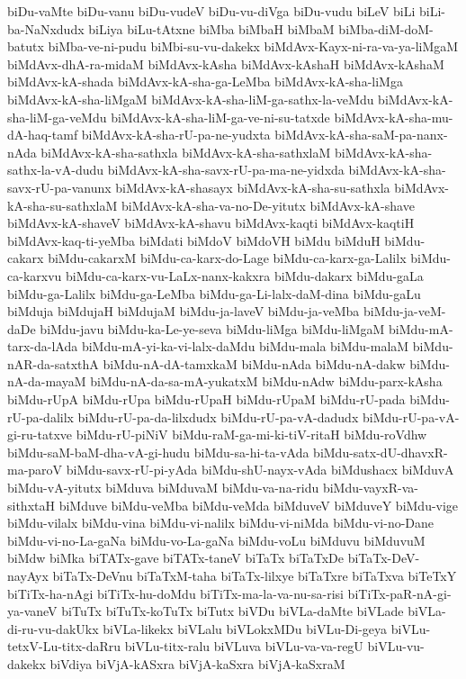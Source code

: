 {biDu-vaMte
biDu-vanu
biDu-vudeV
biDu-vu-diVga
biDu-vudu
biLeV
biLi
biLi-ba-NaNxdudx
biLiya
biLu-tAtxne
biMba
biMbaH
biMbaM
biMba-diM-doM-batutx
biMba-ve-ni-pudu
biMbi-su-vu-dakekx
biMdAvx-Kayx-ni-ra-va-ya-liMgaM
biMdAvx-dhA-ra-midaM
biMdAvx-kAsha
biMdAvx-kAshaH
biMdAvx-kAshaM
biMdAvx-kA-shada
biMdAvx-kA-sha-ga-LeMba
biMdAvx-kA-sha-liMga
biMdAvx-kA-sha-liMgaM
biMdAvx-kA-sha-liM-ga-sathx-la-veMdu
biMdAvx-kA-sha-liM-ga-veMdu
biMdAvx-kA-sha-liM-ga-ve-ni-su-tatxde
biMdAvx-kA-sha-mu-dA-haq-tamf
biMdAvx-kA-sha-rU-pa-ne-yudxta
biMdAvx-kA-sha-saM-pa-nanx-nAda
biMdAvx-kA-sha-sathxla
biMdAvx-kA-sha-sathxlaM
biMdAvx-kA-sha-sathx-la-vA-dudu
biMdAvx-kA-sha-savx-rU-pa-ma-ne-yidxda
biMdAvx-kA-sha-savx-rU-pa-vanunx
biMdAvx-kA-shasayx
biMdAvx-kA-sha-su-sathxla
biMdAvx-kA-sha-su-sathxlaM
biMdAvx-kA-sha-va-no-De-yitutx
biMdAvx-kA-shave
biMdAvx-kA-shaveV
biMdAvx-kA-shavu
biMdAvx-kaqti
biMdAvx-kaqtiH
biMdAvx-kaq-ti-yeMba
biMdati
biMdoV
biMdoVH
biMdu
biMduH
biMdu-cakarx
biMdu-cakarxM
biMdu-ca-karx-do-Lage
biMdu-ca-karx-ga-Lalilx
biMdu-ca-karxvu
biMdu-ca-karx-vu-LaLx-nanx-kakxra
biMdu-dakarx
biMdu-gaLa
biMdu-ga-Lalilx
biMdu-ga-LeMba
biMdu-ga-Li-lalx-daM-dina
biMdu-gaLu
biMduja
biMdujaH
biMdujaM
biMdu-ja-laveV
biMdu-ja-veMba
biMdu-ja-veM-daDe
biMdu-javu
biMdu-ka-Le-ye-seva
biMdu-liMga
biMdu-liMgaM
biMdu-mA-tarx-da-lAda
biMdu-mA-yi-ka-vi-lalx-daMdu
biMdu-mala
biMdu-malaM
biMdu-nAR-da-satxthA
biMdu-nA-dA-tamxkaM
biMdu-nAda
biMdu-nA-dakw
biMdu-nA-da-mayaM
biMdu-nA-da-sa-mA-yukatxM
biMdu-nAdw
biMdu-parx-kAsha
biMdu-rUpA
biMdu-rUpa
biMdu-rUpaH
biMdu-rUpaM
biMdu-rU-pada
biMdu-rU-pa-dalilx
biMdu-rU-pa-da-lilxdudx
biMdu-rU-pa-vA-dadudx
biMdu-rU-pa-vA-gi-ru-tatxve
biMdu-rU-piNiV
biMdu-raM-ga-mi-ki-tiV-ritaH
biMdu-roVdhw
biMdu-saM-baM-dha-vA-gi-hudu
biMdu-sa-hi-ta-vAda
biMdu-satx-dU-dhavxR-ma-paroV
biMdu-savx-rU-pi-yAda
biMdu-shU-nayx-vAda
biMdushacx
biMduvA
biMdu-vA-yitutx
biMduva
biMduvaM
biMdu-va-na-ridu
biMdu-vayxR-va-sithxtaH
biMduve
biMdu-veMba
biMdu-veMda
biMduveV
biMduveY
biMdu-vige
biMdu-vilalx
biMdu-vina
biMdu-vi-nalilx
biMdu-vi-niMda
biMdu-vi-no-Dane
biMdu-vi-no-La-gaNa
biMdu-vo-La-gaNa
biMdu-voLu
biMduvu
biMduvuM
biMdw
biMka
biTATx-gave
biTATx-taneV
biTaTx
biTaTxDe
biTaTx-DeV-nayAyx
biTaTx-DeVnu
biTaTxM-taha
biTaTx-lilxye
biTaTxre
biTaTxva
biTeTxY
biTiTx-ha-nAgi
biTiTx-hu-doMdu
biTiTx-ma-la-va-nu-sa-risi
biTiTx-paR-nA-gi-ya-vaneV
biTuTx
biTuTx-koTuTx
biTutx
biVDu
biVLa-daMte
biVLade
biVLa-di-ru-vu-dakUkx
biVLa-likekx
biVLalu
biVLokxMDu
biVLu-Di-geya
biVLu-tetxV-Lu-titx-daRru
biVLu-titx-ralu
biVLuva
biVLu-va-va-regU
biVLu-vu-dakekx
biVdiya
biVjA-kASxra
biVjA-kaSxra
biVjA-kaSxraM
}
